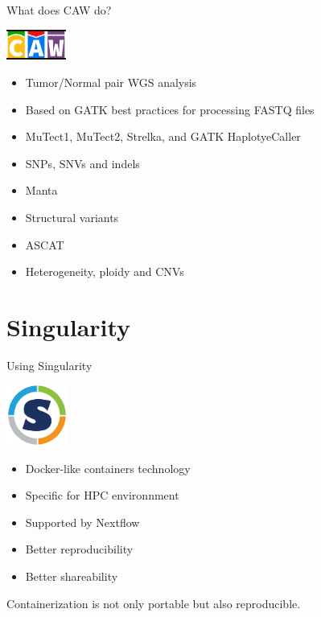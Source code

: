 \documentclass{beamer}
\begin{document}
\begin{frame}{What does CAW do?}
	\begin{center}
		\includegraphics[height=1cm]{pictures/CAW}
	\end{center}
	\pause
	\begin{itemize}
		\item Tumor/Normal pair WGS analysis
		\pause
		\item Based on GATK best practices for processing FASTQ files
		\pause
		\item<4> MuTect1, MuTect2, Strelka, and GATK HaplotyeCaller
		\item<5-> SNPs, SNVs and indels
		\pause
		\item<6> Manta
		\item<7-> Structural variants
		\pause
		\item<8> ASCAT
		\item<9-> Heterogeneity, ploidy and CNVs
	\end{itemize}
\end{frame}

\section{Singularity}

\begin{frame}{Using Singularity}
	\begin{center}
		\includegraphics[height=2cm]{pictures/Singularity}
	\end{center}
	\begin{itemize}
		\item Docker-like containers technology
		\item Specific for HPC environnment
		\pause
		\item Supported by Nextflow
		\pause
		\item Better reproducibility
		\item Better shareability
		\pause
	\end{itemize}
	Containerization is not only portable but also reproducible.
\end{frame}
\end{document}
